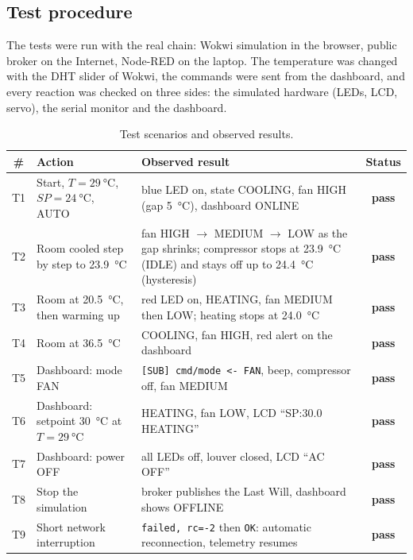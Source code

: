 \documentclass[11pt,a4paper]{article}
\begin{document}
\subsection{Test procedure}
The tests were run with the real chain: Wokwi simulation in the browser, public broker
on the Internet, Node-RED on the laptop. The temperature was changed with the DHT slider of
Wokwi, the commands were sent from the dashboard, and every reaction was checked on three
sides: the simulated hardware (LEDs, LCD, servo), the serial monitor and the dashboard.

\begin{table}[H]
\centering\small
\caption{Test scenarios and observed results.}
\label{tab:tests}
\begin{tabularx}{\linewidth}{@{}c l X c@{}}
\toprule
\textbf{\#} & \textbf{Action} & \textbf{Observed result} & \textbf{Status} \\
\midrule
T1 & Start, $T=\SI{29}{\celsius}$, $SP=\SI{24}{\celsius}$, AUTO & blue LED on, state COOLING, fan HIGH (gap \SI{5}{\celsius}), dashboard ONLINE & \textcolor{okgreen}{\textbf{pass}} \\
T2 & Room cooled step by step to \SI{23.9}{\celsius} & fan HIGH $\to$ MEDIUM $\to$ LOW as the gap shrinks; compressor stops at \SI{23.9}{\celsius} (IDLE) and stays off up to \SI{24.4}{\celsius} (hysteresis) & \textcolor{okgreen}{\textbf{pass}} \\
T3 & Room at \SI{20.5}{\celsius}, then warming up & red LED on, HEATING, fan MEDIUM then LOW; heating stops at \SI{24.0}{\celsius} & \textcolor{okgreen}{\textbf{pass}} \\
T4 & Room at \SI{36.5}{\celsius} & COOLING, fan HIGH, red alert on the dashboard & \textcolor{okgreen}{\textbf{pass}} \\
T5 & Dashboard: mode FAN & \texttt{[SUB] cmd/mode <- FAN}, beep, compressor off, fan MEDIUM & \textcolor{okgreen}{\textbf{pass}} \\
T6 & Dashboard: setpoint \SI{30}{\celsius} at $T=\SI{29}{\celsius}$ & HEATING, fan LOW, LCD ``SP:30.0 HEATING'' & \textcolor{okgreen}{\textbf{pass}} \\
T7 & Dashboard: power OFF & all LEDs off, louver closed, LCD ``AC OFF'' & \textcolor{okgreen}{\textbf{pass}} \\
T8 & Stop the simulation & broker publishes the Last Will, dashboard shows OFFLINE & \textcolor{okgreen}{\textbf{pass}} \\
T9 & Short network interruption & \texttt{failed, rc=-2} then \texttt{OK}: automatic reconnection, telemetry resumes & \textcolor{okgreen}{\textbf{pass}} \\
\bottomrule
\end{tabularx}
\end{table}
\end{document}
